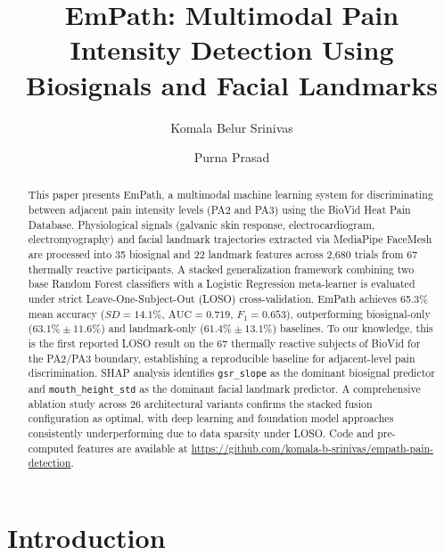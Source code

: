 \documentclass[sigconf]{acmart}
\author{Komala Belur Srinivas}
\affiliation{%
  \institution{Hofstra University}
  \department{Department of Computer Science}
  \city{Hempstead}
  \state{New York}
  \country{USA}
}
\author{Purna Prasad}
\affiliation{%
  \institution{Hofstra University}
  \department{Department of Computer Science}
  \city{Hempstead}
  \state{New York}
  \country{USA}
}
\begin{document}

\title{EmPath: Multimodal Pain Intensity Detection Using\\
       Biosignals and Facial Landmarks}

\begin{abstract}
This paper presents EmPath, a multimodal machine learning system for
discriminating between adjacent pain intensity levels (PA2 and PA3) using the
BioVid Heat Pain Database. Physiological signals (galvanic skin response,
electrocardiogram, electromyography) and facial landmark trajectories extracted
via MediaPipe FaceMesh are processed into 35 biosignal and 22 landmark features
across 2,680 trials from 67 thermally reactive participants. A stacked
generalization framework combining two base Random Forest classifiers with a
Logistic Regression meta-learner is evaluated under strict
Leave-One-Subject-Out (LOSO) cross-validation. EmPath achieves 65.3\% mean
accuracy ($SD = 14.1\%$, $\text{AUC} = 0.719$, $F_1 = 0.653$), outperforming
biosignal-only ($63.1\% \pm 11.6\%$) and landmark-only ($61.4\% \pm 13.1\%$)
baselines. To our knowledge, this is the first reported LOSO result on the 67
thermally reactive subjects of BioVid for the PA2/PA3 boundary, establishing a
reproducible baseline for adjacent-level pain discrimination. SHAP analysis
identifies \texttt{gsr\_slope} as the dominant biosignal predictor and
\texttt{mouth\_height\_std} as the dominant facial landmark predictor. A
comprehensive ablation study across 26 architectural variants confirms the
stacked fusion configuration as optimal, with deep learning and foundation
model approaches consistently underperforming due to data sparsity under LOSO.
Code and pre-computed features are available at
\url{https://github.com/komala-b-srinivas/empath-pain-detection}.
\end{abstract}

\maketitle

\section{Introduction}
\label{sec:intro}
\end{document}
